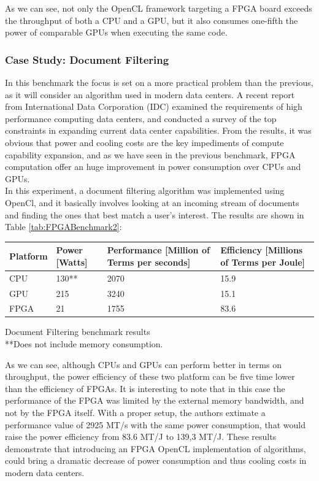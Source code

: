 As we can see, not only the OpenCL framework targeting a FPGA board exceeds the throughput of both a CPU and a GPU, but it also consumes one-fifth the power of comparable GPUs when executing the same code.

\subsubsection{Case Study: Document Filtering}

In this benchmark the focus is set on a more practical problem than the previous, as it will consider an algorithm used in modern data centers.
A recent report \cite{walsh:power} from International Data Corporation (IDC) examined the requirements of high performance computing data centers, and conducted a survey of the top constraints in expanding current data center capabilities. From the results, it was obvious that power and cooling costs are the key impediments of compute capability expansion, and as we have seen in the previous benchmark, FPGA computation offer an huge improvement in power consumption over CPUs and GPUs.\\

In this experiment, a document filtering algorithm was implemented using OpenCl, and it basically involves looking at an incoming stream of documents and finding the ones that best match a user’s interest. The results are shown in Table \ref{tab:FPGABenchmark2}:

\begin{tablehere}
{\footnotesize
\begin{tabular}{|p{}|p{}|p{}|p{}|}\hline
\textbf{Platform} & \textbf{Power} [Watts] & \textbf{Performance} [Million of Terms per seconds] & \textbf{Efficiency} [Millions of Terms per Joule]\\ \hline
CPU & 130** & 2070 & 15.9 \\ \hline
GPU & 215 & 3240 & 15.1 \\ \hline
FPGA & 21 & 1755 & 83.6 \\ \hline
\end{tabular}}
  \caption{Document Filtering benchmark results\\ **Does not include memory consumption.}
	\label{tab:FPGABenchmark2}
\end{tablehere}

As we can see, although CPUs and GPUs can perform better in terms on throughput, the power efficiency of these two platform can be five time lower than the efficiency of FPGAs. It is interesting to note that in this case the performance of the FPGA was limited by the external memory bandwidth, and not by the FPGA itself. With a proper setup, the authors extimate a performance value of 2925 MT/s with the same power consumption, that would raise the power efficiency from 83.6 MT/J to 139,3 MT/J.
These results demonstrate that introducing an FPGA OpenCL implementation of algorithms, could bring a dramatic decrease of power consumption and thus cooling costs in modern data centers.





